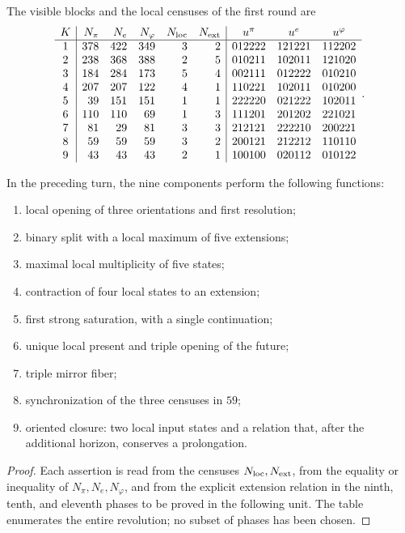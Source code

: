 The visible blocks and the local censuses of the first round are
\[
\begin{array}{c|rrrrr|ccc}
K&N_\pi&N_e&N_\varphi&N_{\rm loc}&N_{\rm ext}
 &u^\pi&u^e&u^\varphi\\\hline
1&378&422&349&3&2&012222&121221&112202\\
2&238&368&388&2&5&010211&102011&121020\\
3&184&284&173&5&4&002111&012222&010210\\
4&207&207&122&4&1&110221&102011&010200\\
5&39&151&151&1&1&222220&021222&102011\\
6&110&110&69&1&3&111201&201202&221021\\
7&81&29&81&3&3&212121&222210&200221\\
8&59&59&59&3&2&200121&212212&110110\\
9&43&43&43&2&1&100100&020112&010122
\end{array}.
\]

\begin{theorem}
\label{p12-83-c7-s1:thm:funciones-nueve-componentes}
In the preceding turn, the nine components perform the following
functions:
\begin{enumerate}
 \item local opening of three orientations and first resolution;
 \item binary split with a local maximum of five extensions;
 \item maximal local multiplicity of five states;
 \item contraction of four local states to an extension;
 \item first strong saturation, with a single continuation;
 \item unique local present and triple opening of the future;
 \item triple mirror fiber;
 \item synchronization of the three censuses in \(59\);
 \item oriented closure: two local input states and a relation that,
       after the additional horizon, conserves a prolongation.
\end{enumerate}
\end{theorem}

\begin{proof}
Each assertion is read from the censuses \(N_{\rm loc},N_{\rm ext}\), from the
equality or inequality of \(N_\pi,N_e,N_\varphi\), and from the explicit extension
relation in the ninth, tenth, and eleventh phases to be proved
in the following unit. The table enumerates the entire revolution; no subset
of phases has been chosen.
\end{proof}

